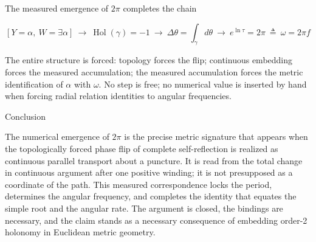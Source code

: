 The measured emergence of \(2\pi\) completes the chain  

\[
[Y=\alpha,\ W=\exists\alpha]\ \to\ \operatorname{Hol}(\gamma)=-1\ \to\ \Delta\theta=\int_\gamma d\theta\ \to\ e^{\ln\tau}=2\pi\ \triangleq\ \omega=2\pi f
\]  

The entire structure is forced: topology forces the flip; continuous embedding forces the measured accumulation; the measured accumulation forces the metric identification of \(\alpha\) with \(\omega\). No step is free; no numerical value is inserted by hand when forcing radial relation identities to angular frequencies.

Conclusion

The numerical emergence of \(2\pi\) is the precise metric signature that appears when the topologically forced phase flip of complete self-reflection is realized as continuous parallel transport about a puncture. It is read from the total change in continuous argument after one positive winding; it is not presupposed as a coordinate of the path. This measured correspondence locks the period, determines the angular frequency, and completes the identity that equates the simple root and the angular rate. The argument is closed, the bindings are necessary, and the claim stands as a necessary consequence of embedding order-2 holonomy in Euclidean metric geometry.
